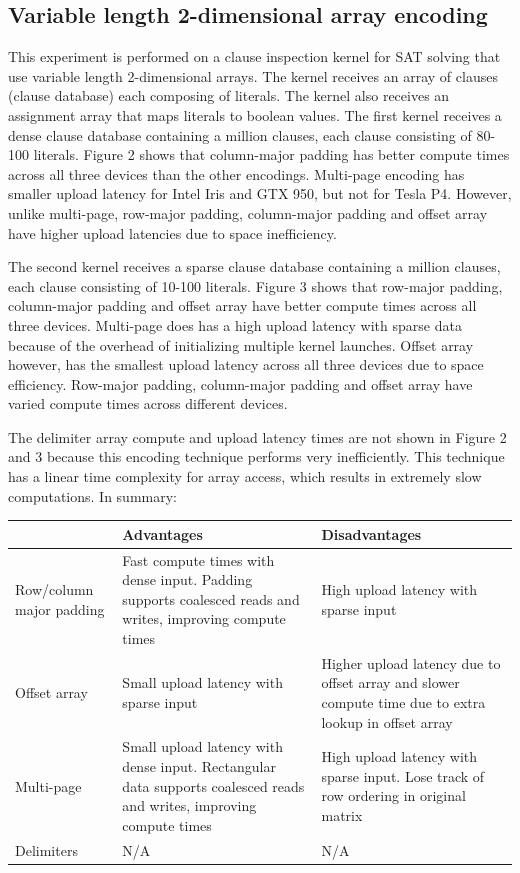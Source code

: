 \documentclass[conference]{IEEEtran}
\begin{document}
\subsection{Variable length 2-dimensional array encoding}
This experiment is performed on a clause inspection kernel for SAT solving that use variable length 2-dimensional arrays. The kernel receives an array of clauses (clause database) each composing of literals. The kernel also receives an assignment array that maps literals to boolean values. The first kernel receives a dense clause database containing a million clauses, each clause consisting of 80-100 literals. Figure 2 shows that column-major padding has better compute times across all three devices than the other encodings. Multi-page encoding has smaller upload latency for Intel Iris and GTX 950, but not for Tesla P4. However, unlike multi-page, row-major padding, column-major padding and offset array have higher upload latencies due to space inefficiency.

The second kernel receives a sparse clause database containing a million clauses, each clause consisting of 10-100 literals. Figure 3 shows that row-major padding, column-major padding and offset array have better compute times across all three devices. Multi-page does has a high upload latency with sparse data because of the overhead of initializing multiple kernel launches. Offset array however, has the smallest upload latency across all three devices due to space efficiency. Row-major padding, column-major padding and offset array have varied compute times across different devices.

The delimiter array compute and upload latency times are not shown in Figure 2 and 3 because this encoding technique performs very inefficiently. This technique has a linear time complexity for array access, which results in extremely slow computations. In summary:

\begin{center}
\begin{tabular}{ | m{5em} | m{3cm}| m{3cm} | } 
\hline
 & Advantages & Disadvantages \\ 
\hline
Row/column major padding & Fast compute times with dense input. Padding supports coalesced reads and writes, improving compute times & High upload latency with sparse input \\ 
\hline
Offset array & Small upload latency with sparse input & Higher upload latency due to offset array
and slower compute time due to extra lookup in offset array \\ 
\hline
Multi-page & Small upload latency with dense input. Rectangular data supports coalesced reads and writes, improving compute times & High upload latency with sparse input. Lose track of row ordering in original matrix \\ 
\hline
Delimiters & N/A & N/A \\ 
\hline
\end{tabular}
\end{center} 
\end{document}
